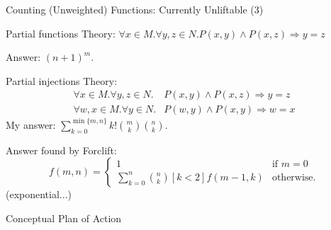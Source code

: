 \documentclass{beamer}
\begin{document}
\begin{frame}{Counting (Unweighted) Functions: Currently Unliftable (3)}
  \begin{block}{Partial functions}
    Theory: $\forall x \in M. \forall y, z \in N. P(x, y) \land P(x, z)
    \Rightarrow y=z$

    Answer: $(n+1)^m$.
  \end{block}
  \begin{block}{Partial injections}
    Theory:
    \begin{align*}
      \forall x \in M. \forall y, z \in N. &P(x, y) \land P(x, z) \Rightarrow y=z \\
      \forall w, x \in M. \forall y \in N. &P(w, y) \land P(x, y) \Rightarrow w=x
    \end{align*}
    My answer: $\sum_{k=0}^{\min\{m, n\}} k!\binom{m}{k}\binom{n}{k}$.

    \pause
    \alert{Answer found by Forclift:}
    \[
    f(m, n) =
    \begin{cases}
      1 & \text{if } m = 0 \\
      \sum_{k=0}^n \binom{n}{k} [k < 2] f(m-1, k) & \text{otherwise.}
    \end{cases}
    \]
    (exponential...)
  \end{block}
\end{frame}

\begin{frame}{Conceptual Plan of Action}
  \centering
\end{frame}
\end{document}

